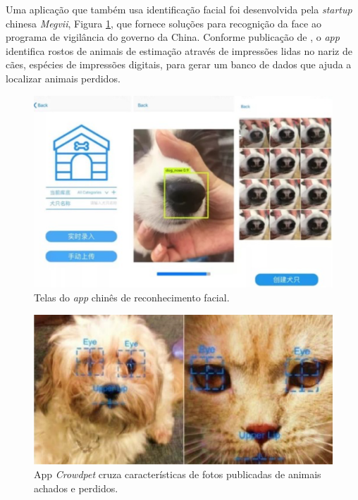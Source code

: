 \documentclass[portuguese]{textolivre}
\begin{document}
Uma aplicação que também usa identificação facial foi desenvolvida pela \textit{startup} chinesa \textit{Megvii}, Figura \ref{fig:006}, que fornece soluções para recognição da face ao programa de vigilância do governo da China. Conforme publicação de \textcite{Tecmundo:2022}, o \textit{app} identifica rostos de animais de estimação através de impressões lidas no nariz de cães, espécies de impressões digitais, para gerar um banco de dados que ajuda a localizar animais perdidos.

\begin{figure}
	\centering
	\includegraphics[scale=0.70]{imagens/fig-006.png}
	\caption{Telas do \textit{app} chinês de reconhecimento facial.}
	\label{fig:006}
\end{figure}

\begin{figure}
	\centering
	\includegraphics[scale=0.70]{imagens/fig-007.png}
	\caption{App \textit{Crowdpet} cruza características de fotos publicadas de animais achados e perdidos.}
	\label{fig:007}
\end{figure}
\end{document}
